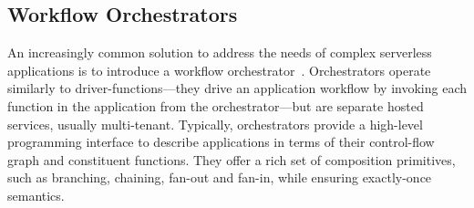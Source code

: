 



\subsection{Workflow Orchestrators}\label{sec:bg:orchestrator}

An increasingly common solution to address the needs of complex serverless
applications is to introduce a workflow orchestrator~\cite{excamera, gg-atc,
aws-step-functions, google-cloud-composer, google-workflows, durable-functions}.
Orchestrators operate similarly to driver-functions---they drive an application
workflow by invoking each function in the application from the
orchestrator---but are separate hosted services, usually multi-tenant.
Typically, orchestrators provide a high-level programming interface to describe
applications in terms of their control-flow graph and constituent functions.
They offer a  rich set of composition primitives, such as branching, chaining,
fan-out and fan-in, while ensuring exactly-once semantics.

